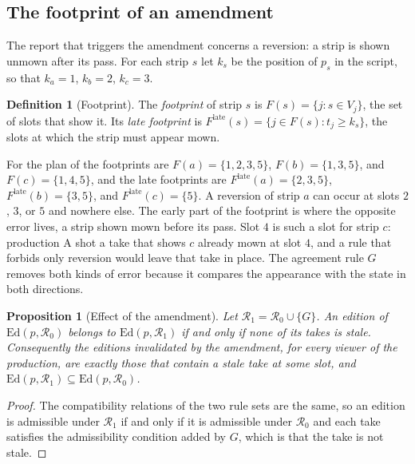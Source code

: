 \documentclass[11pt,twoside,openright]{book}
\theoremstyle{plain}
\newtheorem{proposition}[theorem]{Proposition}
\theoremstyle{definition}
\newtheorem{definition}[theorem]{Definition}
\theoremstyle{remark}
\newcommand{\Ed}{\mathrm{Ed}}       %
\begin{document}
\subsection{The footprint of an amendment}

The report that triggers the amendment concerns a reversion: a strip is shown unmown after its pass. For each strip $s$ let $k_s$ be the position of $p_s$ in the script, so that $k_a=1$, $k_b=2$, $k_c=3$.

\begin{definition}[Footprint]\label{def:footprint}
The \emph{footprint} of strip $s$ is $F(s)=\{j:s\in V_j\}$, the set of slots that show it. Its \emph{late footprint} is $F^{\mathrm{late}}(s)=\{j\in F(s):t_j\ge k_s\}$, the slots at which the strip must appear mown.
\end{definition}

For the plan of  the footprints are $F(a)=\{1,2,3,5\}$, $F(b)=\{1,3,5\}$, and $F(c)=\{1,4,5\}$, and the late footprints are $F^{\mathrm{late}}(a)=\{2,3,5\}$, $F^{\mathrm{late}}(b)=\{3,5\}$, and $F^{\mathrm{late}}(c)=\{5\}$. A reversion of strip $a$ can occur at slots $2$, $3$, or $5$ and nowhere else. The early part of the footprint is where the opposite error lives, a strip shown mown before its pass. Slot $4$ is such a slot for strip $c$: production A shot a take that shows $c$ already mown at slot $4$, and a rule that forbids only reversion would leave that take in place. The agreement rule $G$ removes both kinds of error because it compares the appearance with the state in both directions.

\begin{proposition}[Effect of the amendment]\label{prop:footprint}
Let $\mathcal R_1=\mathcal R_0\cup\{G\}$. An edition of $\Ed(p,\mathcal R_0)$ belongs to $\Ed(p,\mathcal R_1)$ if and only if none of its takes is stale. Consequently the editions invalidated by the amendment, for every viewer of the production, are exactly those that contain a stale take at some slot, and $\Ed(p,\mathcal R_1)\subseteq\Ed(p,\mathcal R_0)$.
\end{proposition}

\begin{proof}
The compatibility relations of the two rule sets are the same, so an edition is admissible under $\mathcal R_1$ if and only if it is admissible under $\mathcal R_0$ and each take satisfies the admissibility condition added by $G$, which is that the take is not stale.
\end{proof}
\end{document}
